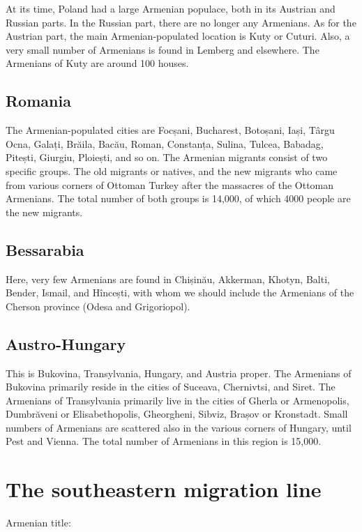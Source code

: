 At its time, Poland had a large Armenian populace, both in its Austrian and Russian parts. In the Russian part, there are no longer any Armenians. As for the Austrian part, the main Armenian-populated location is Kuty or Cuturi. Also, a very small number of Armenians is found in Lemberg and elsewhere. The Armenians of Kuty are around 100 houses.

\subsection{Romania}

The Armenian-populated cities are Focșani, Bucharest, Botoșani, Iași, Târgu Ocna, Galați, Brăila, Bacău, Roman, Constanța, Sulina, Tulcea, Babadag, Pitești, Giurgiu, Ploiești, and so on. The Armenian migrants consist of two specific groups. The old migrants or natives, and the new migrants who came from various corners of Ottoman Turkey after the massacres of the Ottoman Armenians. The total number of both groups is 14,000, of which 4000 people are the new migrants. 

\subsection{Bessarabia}

Here, very few Armenians are found in Chișinău, Akkerman, Khotyn, Balti, Bender, Ismail, and Hîncești, with whom we should include the Armenians of the Cherson province (Odesa and Grigoriopol).

\subsection{Austro-Hungary}

This is Bukovina, Transylvania, Hungary, and Austria proper. The Armenians of Bukovina primarily reside in the cities of Suceava, Chernivtsi, and Siret. The Armenians of Transylvania primarily live in the cities of Gherla or Armenopolis, Dumbrăveni  or Elisabethopolis, Gheorgheni, Sibviz, Brașov or Kronstadt. Small numbers of Armenians are scattered also in the various corners of Hungary, until Pest and Vienna. The total number of Armenians in this region is 15,000. 

\section{The southeastern migration line}

Armenian title: 

